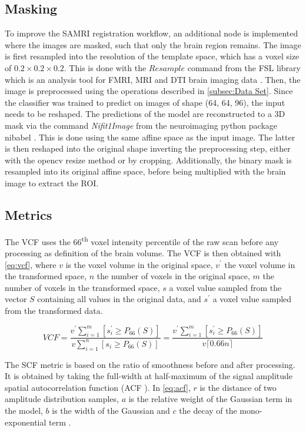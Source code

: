 \subsection{Masking}
To improve the SAMRI registration workflow, an additional node is implemented where the images are masked, such that only the brain region remains.
The image is first resampled into the resolution of the template space, which has a voxel size of $0.2\times 0.2 \times 0.2$.
This is done with the \textcolor{mg}{\texttt{$Resample$}} command from the FSL library which is an analysis tool for FMRI, MRI and DTI brain imaging data \citep{fsl}.
Then, the image is preprocessed using the operations described in \cref{subsec:Data Set}.
Since the classifier was trained to predict on images of shape (64, 64, 96), the input needs to be reshaped.
The predictions of the model are reconstructed to a 3D mask via the command \textit{Nifit1Image} from the neuroimaging python package nibabel \citep{noauthor_neuroimaging_nodate}.
This is done using the same affine space as the input image.
The latter is then reshaped into the original shape inverting the preprocessing step, either with the opencv resize method or by cropping.
Additionally, the binary mask is resampled into its original affine space, before being multiplied with the brain image to extract the ROI.

\subsection{Metrics}

The VCF uses the 66\textsuperscript{th} voxel intensity percentile of the raw scan before any processing as definition of the brain volume.
The VCF is then obtained with \cref{eq:vcf}, where $v$ is the voxel volume in the original space, $v^\prime$ the voxel volume in the transformed space, $n$ the number of voxels in the original space, $m$ the number of voxels in the transformed space, $s$ a voxel value sampled from the vector $S$ containing all values in the original data, and $s^\prime$ a voxel value sampled from the transformed data.

\begin{equation} \label{eq:vcf}
        V\!C\!F
        = \frac{v^\prime\sum_{i=1}^m [s^\prime_i \geq P_{66}(S)]}{v\sum_{i=1}^n [s_i \geq P_{66}(S)]}
        = \frac{v^\prime\sum_{i=1}^m [s^\prime_i \geq P_{66}(S)]}{v \lceil0.66n\rceil}
\end{equation}

The SCF metric is based on the ratio of smoothness before and after processing.
It is obtained by taking the full-width at half-maximum of the signal amplitude spatial autocorrelation function (ACF \cite{eklund2016cluster}).
In \cref{eq:acf}, $r$ is the distance of two amplitude distribution samples, $a$ is the relative weight of the Gaussian term in the model, $b$ is the width of the Gaussian and $c$ the decay of the mono-exponential term \cite{cox2017fmri}.

